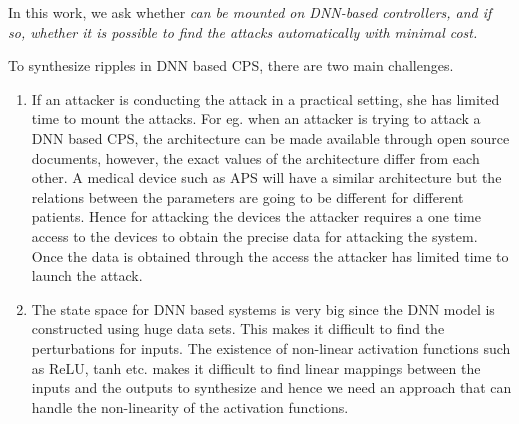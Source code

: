 

In this work, we ask whether { \attack \em can be mounted on DNN-based controllers, and if so, whether it is possible to find the attacks automatically with minimal cost.} 


To synthesize ripples in DNN based CPS, there are two main challenges.
\begin{enumerate}

	\item If an attacker is conducting the attack in a practical setting, she has limited time to mount the attacks. For eg. when an attacker is trying to attack a DNN based CPS, the architecture can be made available through open source documents, however, the exact values of the architecture differ from each other. A medical device such as \ac{APS} will have a similar architecture but the relations between the parameters are going to be different for different patients. Hence for attacking the devices the attacker requires a one time access to the devices to obtain the precise data for attacking the system. Once the data is obtained through the access the attacker has limited time to launch the attack.  %
	\item The state space for DNN based systems is very big since the DNN model is constructed using huge data sets. This makes it difficult to find the perturbations for inputs. The existence of non-linear activation functions such as ReLU, tanh etc. makes it difficult to find linear mappings between the inputs and the outputs to synthesize \attack and hence we need an approach that can handle the  non-linearity of the activation functions. 
\end{enumerate}

